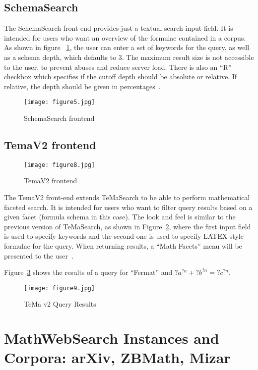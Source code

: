 \documentclass{deliverablereport}
\def\MWS{\textsf{MathWebSearch}\xspace}
\begin{document}
\subsection{SchemaSearch}\label{shcemasearch}
The SchemaSearch front-end provides just a textual search input field. It is intended for
users who want an overview of the formulae contained in a corpus. As shown in figure
~\ref{fig:schema_search}, the user can enter a set of keywords for the query, as well as a
schema depth, which defaults to 3. The maximum result size is not accessible to the user,
to prevent abuses and reduce server load. There is also an “R” checkbox which specifies if
the cutoff depth should be absolute or relative. If relative, the depth should be given in
percentages~\cite{Ham:bcs15}.

\begin{figure}[h]
\centering
 \texttt{[image: figure5.jpg]}
 \caption{SchemaSearch frontend}
 \label{fig:schema_search}
\end{figure}



\subsection{TemaV2 frontend}\label{v2}

\begin{figure}[H]
\centering
 \texttt{[image: figure8.jpg]}
 \caption{TemaV2 frontend}
 \label{fig:temav2}
\end{figure}

The TemaV2 front-end extends TeMaSearch to be able to perform mathematical faceted
search. It is intended for users who want to filter query results based on a given facet
(formula schema in this case). The look and feel is similar to the previous version of
TeMaSearch, as shown in Figure~\ref{fig:temav2}, where the first input field is used to
specify keywords and the second one is used to specify LATEX-style formulae for the
query. When returning results, a “Math Facets” menu will be presented to the
user~\cite{Ham:bcs15}.



Figure~\ref{fig:temav2query} shows the results of a query for “Fermat” and $?a^{?n}+?b^{?n}=?c^{?n}$.
\begin{figure}[H]
\centering
 \texttt{[image: figure9.jpg]}
 \caption{TeMa v2 Query Results}
 \label{fig:temav2query}
\end{figure}


\section{\MWS Instances and Corpora: arXiv, ZBMath, Mizar}\label{sec:arxiv}
\end{document}
